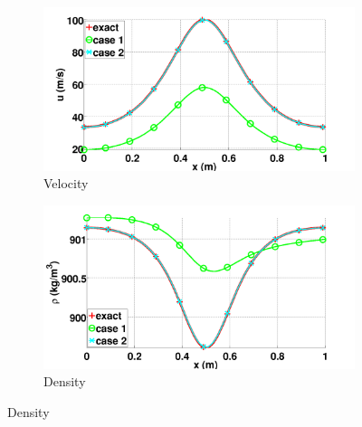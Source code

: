 %
\begin{figure}[H]
        \centering
        \begin{subfigure}[b]{0.5\textwidth}
                \centering
                \includegraphics[width=\textwidth]{figures/liquid_velocity_llf_and_exact_100.png}
                \caption{Velocity}
                \label{fig:liq-phase-vel}
        \end{subfigure}%
        \begin{subfigure}[b]{0.5\textwidth}
                \centering
                \includegraphics[width=\textwidth]{figures/liquid_density_llf_and_exact_100.png}
                \caption{Density}
                \label{fig:liq-phase-density}
        \end{subfigure}
        

\end{figure}
